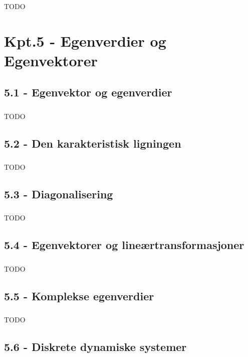\documentclass{article}
\begin{document}
      \subsubsection{}
        TODO
  \section{Kpt.5 - Egenverdier og Egenvektorer}
    \subsection{5.1 - Egenvektor og egenverdier}
      \subsubsection{}
        TODO
    \subsection{5.2 - Den karakteristisk ligningen}
      \subsubsection{}
        TODO
    \subsection{5.3 - Diagonalisering}
      \subsubsection{}
        TODO
    \subsection{5.4 - Egenvektorer og lineærtransformasjoner}
      \subsubsection{}
        TODO
    \subsection{5.5 - Komplekse egenverdier}
      \subsubsection{}
        TODO
    \subsection{5.6 - Diskrete dynamiske systemer}
\end{document}
